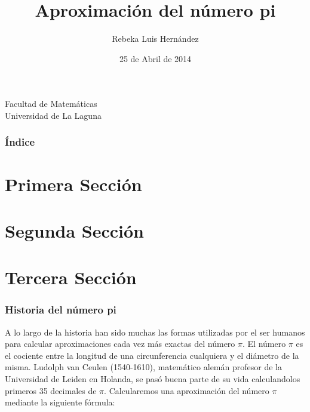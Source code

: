 \documentclass{beamer}
\title[Número pi]{Aproximación del número pi}
\author[Rebeka]{Rebeka Luis Hernández}
\date[25.04.14]{25 de Abril de 2014}
\begin{document}
\begin{frame}
 
  \hspace*{7.0cm}
  \titlepage

  \begin{small}
    \begin{center}
     Facultad de Matemáticas \\
     Universidad de La Laguna
    \end{center}
  \end{small}

\end{frame}

\begin{frame}
  \frametitle{Índice}
  \tableofcontents[pausesections]
\end{frame}

\section{Primera Sección}
\section{Segunda Sección}
\section{Tercera Sección}

\begin{frame}

\frametitle{Historia del número pi}

A lo largo de la historia han sido muchas las formas utilizadas por el ser humanos para calcular aproximaciones 
cada vez más exactas del número $\pi$. El número $\pi$ es el cociente entre la longitud de una circunferencia 
cualquiera y el diámetro de la misma. Ludolph van Ceulen (1540-1610), matemático alemán profesor de la 
Universidad de Leiden en Holanda, se pasó buena parte de su vida calculandolos primeros 35 decimales de $\pi$.
Calcularemos una aproximación del número $\pi$ mediante la siguiente fórmula:

\end{frame}
\end{document}
